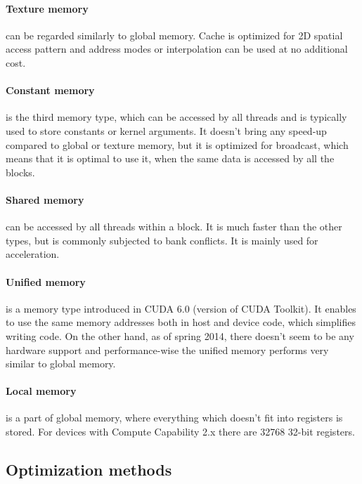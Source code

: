 \FloatBarrier

\paragraph{Texture memory} can be regarded similarly to global memory. Cache is optimized for 2D spatial access pattern and address modes or interpolation can be used at no additional cost.

\paragraph{Constant memory} is the third memory type, which can be accessed by all threads and is typically used to store constants or kernel arguments. It doesn't bring any speed-up compared to global or texture memory, but it is optimized for broadcast, which means that it is optimal to use it, when the same data is accessed by all the blocks.

\paragraph{Shared memory} can be accessed by all threads within a block. It is much faster than the other types, but is commonly subjected to bank conflicts. It is mainly used for acceleration.

\paragraph{Unified memory} is a memory type introduced in CUDA 6.0 (version of CUDA Toolkit). It enables to use the same memory addresses both in host and device code, which simplifies writing code. On the other hand, as of spring 2014, there doesn't seem to be any hardware support and performance-wise the unified memory performs very similar to global memory.

\paragraph{Local memory} is a part of global memory, where everything which doesn't fit into registers is stored. For devices with Compute Capability 2.x there are 32768 32-bit registers.



\subsection{Optimization methods}\label{subsec:optimization}

